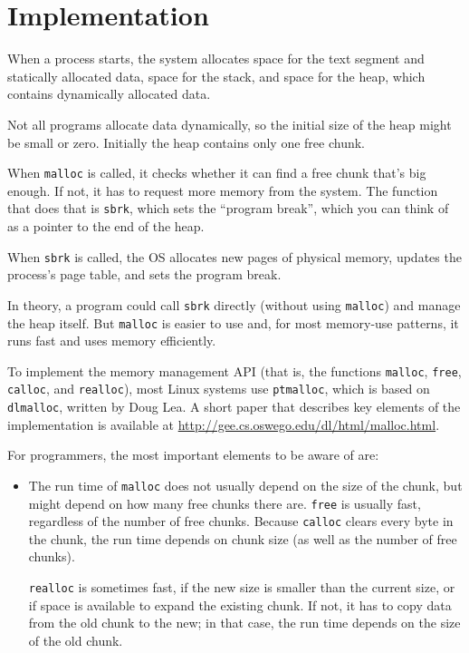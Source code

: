 \documentclass[12pt]{book}
\begin{document}
{\section{Implementation}

When a process starts, the system allocates space for the text segment
and statically allocated data, space for the stack, and space for the
heap, which contains dynamically allocated data.

Not all programs allocate data dynamically, so the initial size of the
heap might be small or zero.  Initially the heap contains only one
free chunk.

When {\tt malloc} is called, it checks whether it can find a free
chunk that's big enough.  If not, it has to request more memory
from the system.  The function that does that is {\tt sbrk},
which sets the ``program break'', which you can think of as a pointer
to the end of the heap.

When {\tt sbrk} is called, the OS allocates new pages of physical
memory, updates the process's page table, and sets the program
break.

In theory, a program could call {\tt sbrk} directly (without using
{\tt malloc}) and manage the heap itself.  But {\tt malloc} is easier
to use and, for most memory-use patterns, it runs fast and uses memory
efficiently.

To implement the memory management API (that is, the functions
{\tt malloc}, {\tt free}, {\tt calloc}, and {\tt realloc}),
most Linux systems use {\tt ptmalloc},
which is based on {\tt dlmalloc}, written by Doug Lea.  A short paper
that describes key elements of the implementation is
available at \url{http://gee.cs.oswego.edu/dl/html/malloc.html}.

For programmers, the most important elements to be aware of are:

\begin{itemize}

\item The run time of {\tt malloc} does not usually depend on the
size of the chunk, but might depend on how many free chunks there
are.  {\tt free} is usually fast, regardless of the number of
free chunks.  Because {\tt calloc} clears every byte in the chunk,
the run time depends on chunk size (as well as the number of free
chunks).

{\tt realloc} is sometimes fast, if the new size is smaller than the
current size, or if space is available to expand the existing chunk.
If not, it has to copy data from the old chunk to the new; in that
case, the run time depends on the size of the old chunk.


\end{itemize}}
\end{document}
